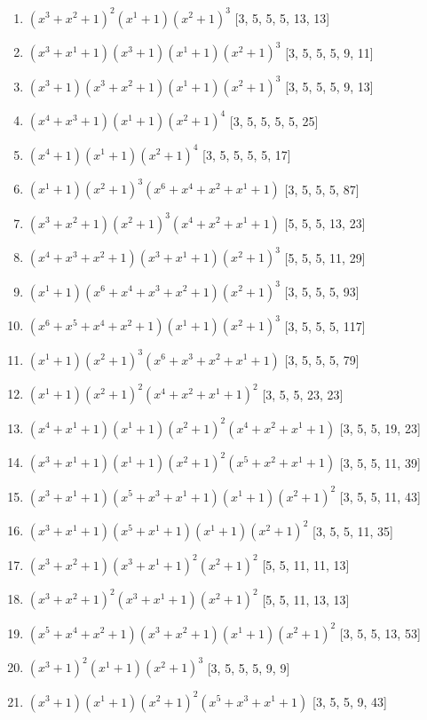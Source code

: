 \documentclass[10pt,twocolumn]{article}
\begin{document}
\begin{enumerate}
\item $(x^{3} + x^{2} + 1)^{2}(x^{1} + 1)(x^{2} + 1)^{3}$  [3, 5, 5, 5, 13, 13]
\item $(x^{3} + x^{1} + 1)(x^{3} + 1)(x^{1} + 1)(x^{2} + 1)^{3}$  [3, 5, 5, 5, 9, 11]
\item $(x^{3} + 1)(x^{3} + x^{2} + 1)(x^{1} + 1)(x^{2} + 1)^{3}$  [3, 5, 5, 5, 9, 13]
\item $(x^{4} + x^{3} + 1)(x^{1} + 1)(x^{2} + 1)^{4}$  [3, 5, 5, 5, 5, 25]
\item $(x^{4} + 1)(x^{1} + 1)(x^{2} + 1)^{4}$  [3, 5, 5, 5, 5, 17]
\item $(x^{1} + 1)(x^{2} + 1)^{3}(x^{6} + x^{4} + x^{2} + x^{1} + 1)$  [3, 5, 5, 5, 87]
\item $(x^{3} + x^{2} + 1)(x^{2} + 1)^{3}(x^{4} + x^{2} + x^{1} + 1)$  [5, 5, 5, 13, 23]
\item $(x^{4} + x^{3} + x^{2} + 1)(x^{3} + x^{1} + 1)(x^{2} + 1)^{3}$  [5, 5, 5, 11, 29]
\item $(x^{1} + 1)(x^{6} + x^{4} + x^{3} + x^{2} + 1)(x^{2} + 1)^{3}$  [3, 5, 5, 5, 93]
\item $(x^{6} + x^{5} + x^{4} + x^{2} + 1)(x^{1} + 1)(x^{2} + 1)^{3}$  [3, 5, 5, 5, 117]
\item $(x^{1} + 1)(x^{2} + 1)^{3}(x^{6} + x^{3} + x^{2} + x^{1} + 1)$  [3, 5, 5, 5, 79]
\item $(x^{1} + 1)(x^{2} + 1)^{2}(x^{4} + x^{2} + x^{1} + 1)^{2}$  [3, 5, 5, 23, 23]
\item $(x^{4} + x^{1} + 1)(x^{1} + 1)(x^{2} + 1)^{2}(x^{4} + x^{2} + x^{1} + 1)$  [3, 5, 5, 19, 23]
\item $(x^{3} + x^{1} + 1)(x^{1} + 1)(x^{2} + 1)^{2}(x^{5} + x^{2} + x^{1} + 1)$  [3, 5, 5, 11, 39]
\item $(x^{3} + x^{1} + 1)(x^{5} + x^{3} + x^{1} + 1)(x^{1} + 1)(x^{2} + 1)^{2}$  [3, 5, 5, 11, 43]
\item $(x^{3} + x^{1} + 1)(x^{5} + x^{1} + 1)(x^{1} + 1)(x^{2} + 1)^{2}$  [3, 5, 5, 11, 35]
\item $(x^{3} + x^{2} + 1)(x^{3} + x^{1} + 1)^{2}(x^{2} + 1)^{2}$  [5, 5, 11, 11, 13]
\item $(x^{3} + x^{2} + 1)^{2}(x^{3} + x^{1} + 1)(x^{2} + 1)^{2}$  [5, 5, 11, 13, 13]
\item $(x^{5} + x^{4} + x^{2} + 1)(x^{3} + x^{2} + 1)(x^{1} + 1)(x^{2} + 1)^{2}$  [3, 5, 5, 13, 53]
\item $(x^{3} + 1)^{2}(x^{1} + 1)(x^{2} + 1)^{3}$  [3, 5, 5, 5, 9, 9]
\item $(x^{3} + 1)(x^{1} + 1)(x^{2} + 1)^{2}(x^{5} + x^{3} + x^{1} + 1)$  [3, 5, 5, 9, 43]

\end{enumerate}
\end{document}
